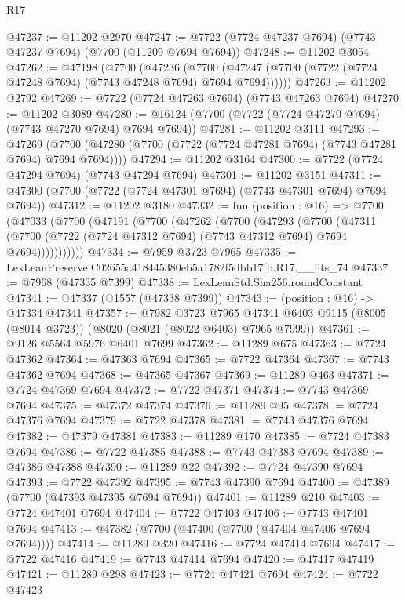 \begin{lexlean}{R17}
\begin{coremodule}
@47237 := @11202 @2970
@47247 := @7722 (@7724 @47237 @7694) (@7743 @47237 @7694) (@7700 (@11209 @7694 @7694))
@47248 := @11202 @3054
@47262 := @47198
    (@7700
      (@47236
        (@7700 (@47247 (@7700 (@7722 (@7724 @47248 @7694) (@7743 @47248 @7694) @7694 @7694))))))
@47263 := @11202 @2792
@47269 := @7722 (@7724 @47263 @7694) (@7743 @47263 @7694)
@47270 := @11202 @3089
@47280 := @16124 (@7700 (@7722 (@7724 @47270 @7694) (@7743 @47270 @7694) @7694 @7694))
@47281 := @11202 @3111
@47293 := @47269
    (@7700 (@47280 (@7700 (@7722 (@7724 @47281 @7694) (@7743 @47281 @7694) @7694 @7694))))
@47294 := @11202 @3164
@47300 := @7722 (@7724 @47294 @7694) (@7743 @47294 @7694)
@47301 := @11202 @3151
@47311 := @47300 (@7700 (@7722 (@7724 @47301 @7694) (@7743 @47301 @7694) @7694 @7694))
@47312 := @11202 @3180
@47332 := fun (position : @16) =>
  @7700
    (@47033
      (@7700
        (@47191
          (@7700
            (@47262
              (@7700
                (@47293
                  (@7700
                    (@47311
                      (@7700 (@7722 (@7724 @47312 @7694) (@7743 @47312 @7694) @7694 @7694)))))))))))
@47334 := @7959 @3723 @7965
@47335 := LexLeanPreserve.C02655a418445380eb5a1782f5dbb17fb.R17.__fits_74
@47337 := @7968 (@47335 @7399)
@47338 := LexLeanStd.Sha256.roundConstant
@47341 := @47337 (@1557 (@47338 @7399))
@47343 := (position : @16) -> @47334 @47341
@47357 := @7982
    @3723
    @7965
    @47341
    @6403
    @9115
    (@8005 (@8014 @3723))
    (@8020 (@8021 (@8022 @6403) @7965 @7999))
@47361 := @9126 @5564 @5976 @6401 @7699
@47362 := @11289 @675
@47363 := @7724 @47362
@47364 := @47363 @7694
@47365 := @7722 @47364
@47367 := @7743 @47362 @7694
@47368 := @47365 @47367
@47369 := @11289 @463
@47371 := @7724 @47369 @7694
@47372 := @7722 @47371
@47374 := @7743 @47369 @7694
@47375 := @47372 @47374
@47376 := @11289 @95
@47378 := @7724 @47376 @7694
@47379 := @7722 @47378
@47381 := @7743 @47376 @7694
@47382 := @47379 @47381
@47383 := @11289 @170
@47385 := @7724 @47383 @7694
@47386 := @7722 @47385
@47388 := @7743 @47383 @7694
@47389 := @47386 @47388
@47390 := @11289 @22
@47392 := @7724 @47390 @7694
@47393 := @7722 @47392
@47395 := @7743 @47390 @7694
@47400 := @47389 (@7700 (@47393 @47395 @7694 @7694))
@47401 := @11289 @210
@47403 := @7724 @47401 @7694
@47404 := @7722 @47403
@47406 := @7743 @47401 @7694
@47413 := @47382 (@7700 (@47400 (@7700 (@47404 @47406 @7694 @7694))))
@47414 := @11289 @320
@47416 := @7724 @47414 @7694
@47417 := @7722 @47416
@47419 := @7743 @47414 @7694
@47420 := @47417 @47419
@47421 := @11289 @298
@47423 := @7724 @47421 @7694
@47424 := @7722 @47423

\end{coremodule}
\end{lexlean}
